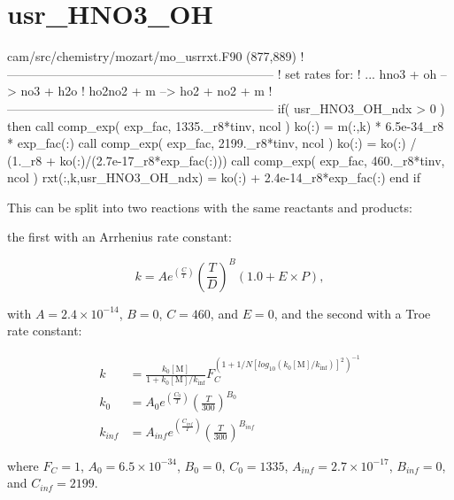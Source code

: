 \documentclass[titlepage]{article}
\begin{document}

\section{usr\_HNO3\_OH}

\begin{blockcode}[commandchars=\\\{\}]
\color{gray}cam/src/chemistry/mozart/mo_usrrxt.F90 (877,889)
!-----------------------------------------------------------------
! set rates for:
!   ... hno3 + oh --> no3 + h2o
!           ho2no2 + m --> ho2 + no2 + m
!-----------------------------------------------------------------
       if( usr_HNO3_OH_ndx > 0 ) then
          call comp_exp( exp_fac, 1335._r8*tinv, ncol )
          ko(:) = m(:,k) * 6.5e-34_r8 * exp_fac(:)
          call comp_exp( exp_fac, 2199._r8*tinv, ncol )
          ko(:) = ko(:) / (1._r8 + ko(:)/(2.7e-17_r8*exp_fac(:)))
          call comp_exp( exp_fac, 460._r8*tinv, ncol )
          rxt(:,k,usr_HNO3_OH_ndx) = ko(:) + 2.4e-14_r8*exp_fac(:)
       end if
\end{blockcode}

This can be split into two reactions with the same reactants and products:
\vspace{20px}


\vspace{20px}
\noindent the first with an Arrhenius rate constant:

\begin{equation}
k = Ae^{(\frac{C}{T})}(\frac{T}{D})^B(1.0+E \times P),
\end{equation}

\noindent with $A = 2.4 \times 10^{-14}$, $B = 0$, $C = 460$, and $E = 0$, and the second
with a Troe rate constant:

\begin{equation}
\begin{split}
k & = \frac{k_0[\mbox{M}]}{1+k_0[\mbox{M}]/k_{\inf}}F_C^{(1+1/N[log_{10}(k_0[\mbox{M}]/k_{\inf})]^2)^{-1}} \\
k_0 & = A_0 e^{\left( \frac{C_0}{T} \right)} \left( \frac{T}{300} \right)^{B_0} \\
k_{inf} & = A_{inf} e^{\left( \frac{C_{inf}}{T} \right)} \left( \frac{T}{300} \right)^{B_{inf}}
\end{split}
\end{equation}

\noindent where $F_C = 1$, $A_0 = 6.5 \times 10^{-34}$, $B_0 = 0$, $C_0 = 1335$, $A_{inf} = 2.7 \times 10^{-17}$, $B_{inf} = 0$, and $C_{inf} = 2199$.
\end{document}
